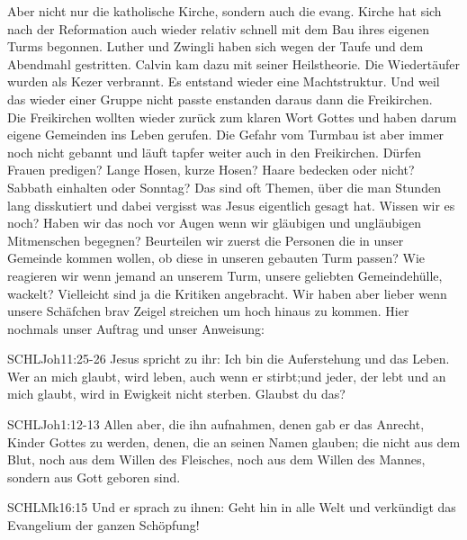 \documentclass[14pt]{../../inc/mybib}
\newenvironment{block}[1][]{%
  \vspace{1.5em}%
  \noindent\textbf{#1}\par%
  \vspace{0.0em}%
}{%
  \vspace{1em}%
}
\begin{document}
\begin{block}
    Aber nicht nur die katholische Kirche, sondern auch die evang. Kirche hat sich nach der Reformation auch wieder relativ schnell mit dem Bau ihres eigenen Turms begonnen.
    Luther und Zwingli haben sich wegen der Taufe und dem Abendmahl gestritten. Calvin kam dazu mit seiner Heilstheorie. Die Wiedertäufer wurden als Kezer verbrannt. Es entstand wieder eine Machtstruktur. Und weil das wieder einer Gruppe nicht passte enstanden daraus dann die Freikirchen.\\
    Die Freikirchen wollten wieder zurück zum klaren Wort Gottes und haben darum eigene Gemeinden ins Leben gerufen. Die Gefahr vom Turmbau ist aber immer noch nicht gebannt und läuft tapfer weiter auch in den Freikirchen. Dürfen Frauen predigen? Lange Hosen, kurze Hosen? Haare bedecken oder nicht? Sabbath einhalten oder Sonntag? Das sind oft Themen, über die man Stunden lang disskutiert und dabei vergisst was Jesus eigentlich gesagt hat. Wissen wir es noch? Haben wir das noch vor Augen wenn wir gläubigen und ungläubigen Mitmenschen begegnen? Beurteilen wir zuerst die Personen die in unser Gemeinde kommen wollen, ob diese in unseren gebauten Turm passen? Wie reagieren wir wenn jemand an unserem Turm, unsere geliebten Gemeindehülle, wackelt? Vielleicht sind ja die Kritiken angebracht. Wir haben aber lieber wenn unsere Schäfchen brav Zeigel streichen um hoch hinaus zu kommen.
    Hier nochmals unser Auftrag und unser Anweisung:
    \begin{bibelbox}{SCHL}{Joh}{11:25-26}
        Jesus spricht zu ihr: Ich bin die Auferstehung und das Leben. Wer an mich glaubt, wird leben, auch wenn er stirbt;und jeder, der lebt und an mich glaubt, wird in Ewigkeit nicht sterben. Glaubst du das?
    \end{bibelbox} 
    \begin{bibelbox}{SCHL}{Joh}{1:12-13}
        Allen aber, die ihn aufnahmen, denen gab er das Anrecht, Kinder Gottes zu werden, denen, die an seinen Namen glauben;
        die nicht aus dem Blut, noch aus dem Willen des Fleisches, noch aus dem Willen des Mannes, sondern aus Gott geboren sind.
    \end{bibelbox}     
    \begin{bibelbox}{SCHL}{Mk}{16:15}
        Und er sprach zu ihnen: Geht hin in alle Welt und verkündigt das Evangelium der ganzen Schöpfung!
    \end{bibelbox} 
   
\end{block}
\end{document}
